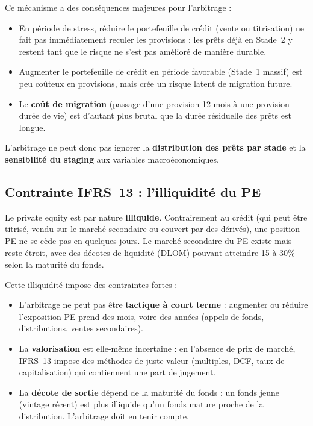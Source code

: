 \documentclass[12pt,a4paper]{article}
\begin{document}
Ce mécanisme a des conséquences majeures pour l'arbitrage :

\begin{itemize}
  \item En période de stress, réduire le portefeuille de crédit (vente ou titrisation) ne fait pas immédiatement reculer les provisions : les prêts déjà en Stade~2 y restent tant que le risque ne s'est pas amélioré de manière durable.
  \item Augmenter le portefeuille de crédit en période favorable (Stade~1 massif) est peu coûteux en provisions, mais crée un risque latent de migration future.
  \item Le \textbf{coût de migration} (passage d'une provision 12 mois à une provision durée de vie) est d'autant plus brutal que la durée résiduelle des prêts est longue.
\end{itemize}

L'arbitrage ne peut donc pas ignorer la \textbf{distribution des prêts par stade} et la \textbf{sensibilité du staging} aux variables macroéconomiques.

\subsection{Contrainte IFRS~13 : l'illiquidité du PE}

Le private equity est par nature \textbf{illiquide}. Contrairement au crédit (qui peut être titrisé, vendu sur le marché secondaire ou couvert par des dérivés), une position PE ne se cède pas en quelques jours. Le marché secondaire du PE existe mais reste étroit, avec des décotes de liquidité (DLOM) pouvant atteindre 15 à 30\% selon la maturité du fonds.

Cette illiquidité impose des contraintes fortes :

\begin{itemize}
  \item L'arbitrage ne peut pas être \textbf{tactique à court terme} : augmenter ou réduire l'exposition PE prend des mois, voire des années (appels de fonds, distributions, ventes secondaires).
  \item La \textbf{valorisation} est elle-même incertaine : en l'absence de prix de marché, IFRS~13 impose des méthodes de juste valeur (multiples, DCF, taux de capitalisation) qui contiennent une part de jugement.
  \item La \textbf{décote de sortie} dépend de la maturité du fonds : un fonds jeune (vintage récent) est plus illiquide qu'un fonds mature proche de la distribution. L'arbitrage doit en tenir compte.
\end{itemize}
\end{document}
